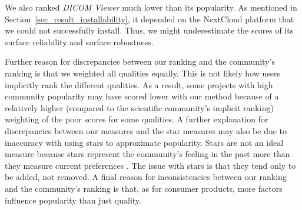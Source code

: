 \documentclass[11pt]{article}
\begin{document}
We also ranked \textit{DICOM Viewer} much lower than its popularity. As
mentioned in Section~\ref{sec_result_installability}, it depended on the
NextCloud platform that we could not successfully install. Thus, we might
underestimate the scores of its surface reliability and surface robustness. 

Further reason for discrepancies between our ranking and the community's ranking
is that we weighted all qualities equally. This is not likely how users
implicitly rank the different qualities. As a result, some projects with high
community popularity may have scored lower with our method because of a
relatively higher (compared to the scientific community's implicit ranking)
weighting of the poor scores for some qualities. A further explanation for
discrepancies between our measures and the star measures may also be due to
inaccuracy with using stars to approximate popularity.  Stars are not an ideal
measure because stars represent the community's feeling in the past more than
they measure current preferences \citep{Szulik2017}.  The issue with stars is
that they tend only to be added, not removed.  A final reason for
inconsistencies between our ranking and the community's ranking is that, as for
consumer products, more factors influence popularity than just quality.
\end{document}
